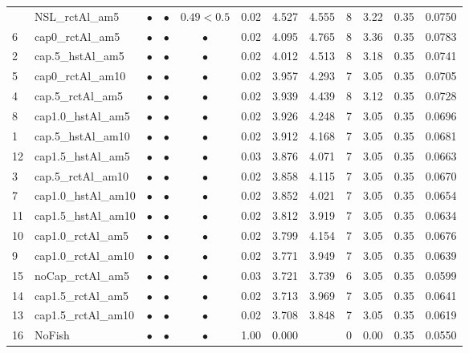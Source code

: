 \documentclass[11pt]{book}
\begin{document}
\begin{landscape}
\begin{longtable}[t]{llcccccccccc}
\midrule
\endhead
\
\endfoot
\bottomrule
\endlastfoot
17 & NSL\_rctAl\_am5 & $\bullet$ & $\bullet$ & $0.49<0.5$ & 0.02 & 4.527 & 4.555 & 8 & 3.22 & 0.35 & 0.0750\\
6 & cap0\_rctAl\_am5 & $\bullet$ & $\bullet$ & $\bullet$ & 0.02 & 4.095 & 4.765 & 8 & 3.36 & 0.35 & 0.0783\\
2 & cap.5\_hstAl\_am5 & $\bullet$ & $\bullet$ & $\bullet$ & 0.02 & 4.012 & 4.513 & 8 & 3.18 & 0.35 & 0.0741\\
5 & cap0\_rctAl\_am10 & $\bullet$ & $\bullet$ & $\bullet$ & 0.02 & 3.957 & 4.293 & 7 & 3.05 & 0.35 & 0.0705\\
4 & cap.5\_rctAl\_am5 & $\bullet$ & $\bullet$ & $\bullet$ & 0.02 & 3.939 & 4.439 & 8 & 3.12 & 0.35 & 0.0728\\
8 & cap1.0\_hstAl\_am5 & $\bullet$ & $\bullet$ & $\bullet$ & 0.02 & 3.926 & 4.248 & 7 & 3.05 & 0.35 & 0.0696\\
1 & cap.5\_hstAl\_am10 & $\bullet$ & $\bullet$ & $\bullet$ & 0.02 & 3.912 & 4.168 & 7 & 3.05 & 0.35 & 0.0681\\
12 & cap1.5\_hstAl\_am5 & $\bullet$ & $\bullet$ & $\bullet$ & 0.03 & 3.876 & 4.071 & 7 & 3.05 & 0.35 & 0.0663\\
3 & cap.5\_rctAl\_am10 & $\bullet$ & $\bullet$ & $\bullet$ & 0.02 & 3.858 & 4.115 & 7 & 3.05 & 0.35 & 0.0670\\
7 & cap1.0\_hstAl\_am10 & $\bullet$ & $\bullet$ & $\bullet$ & 0.02 & 3.852 & 4.021 & 7 & 3.05 & 0.35 & 0.0654\\
11 & cap1.5\_hstAl\_am10 & $\bullet$ & $\bullet$ & $\bullet$ & 0.02 & 3.812 & 3.919 & 7 & 3.05 & 0.35 & 0.0634\\
10 & cap1.0\_rctAl\_am5 & $\bullet$ & $\bullet$ & $\bullet$ & 0.02 & 3.799 & 4.154 & 7 & 3.05 & 0.35 & 0.0676\\
9 & cap1.0\_rctAl\_am10 & $\bullet$ & $\bullet$ & $\bullet$ & 0.02 & 3.771 & 3.949 & 7 & 3.05 & 0.35 & 0.0639\\
15 & noCap\_rctAl\_am5 & $\bullet$ & $\bullet$ & $\bullet$ & 0.03 & 3.721 & 3.739 & 6 & 3.05 & 0.35 & 0.0599\\
14 & cap1.5\_rctAl\_am5 & $\bullet$ & $\bullet$ & $\bullet$ & 0.02 & 3.713 & 3.969 & 7 & 3.05 & 0.35 & 0.0641\\
13 & cap1.5\_rctAl\_am10 & $\bullet$ & $\bullet$ & $\bullet$ & 0.02 & 3.708 & 3.848 & 7 & 3.05 & 0.35 & 0.0619\\
16 & NoFish & $\bullet$ & $\bullet$ & $\bullet$ & 1.00 & 0.000 &  & 0 & 0.00 & 0.35 & 0.0550\\*
\end{longtable}
\end{landscape}
\endgroup{}
\end{document}

